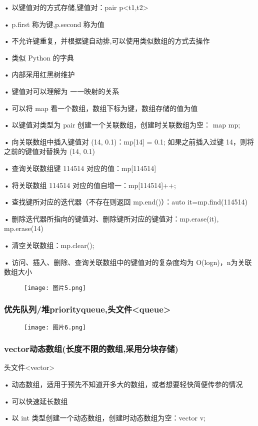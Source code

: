 \documentclass[UTF8]{ctexart}
\begin{document}
• 以键值对的方式存储,键值对：pair p<t1,t2> 

• p.first 称为键,p.second 称为值 

• 不允许键重复，并根据键自动排,可以使用类似数组的方式去操作 

• 类似 Python 的字典 

• 内部采用红黑树维护

• 键值对可以理解为 一一映射的关系 

• 可以将 map 看一个数组，数组下标为键，数组存储的值为值 

• 以键值对类型为 pair 创建一个关联数组，创建时关联数组为空： map mp;

• 向关联数组中插入键值对 (14, 0.1)：mp[14] = 0.1; 如果之前插入过键 14，则将之前的键值对替换为 (14, 0.1) 

• 查询关联数组键 114514 对应的值：mp[114514] 

• 将关联数组 114514 对应的值自增一：mp[114514]++;  

• 查找键所对应的迭代器（不存在则返回 mp.end()）：auto it=mp.find(114514) 

• 删除迭代器所指向的键值对、删除键所对应的键值对：mp.erase(it), mp.erase(14) 

• 清空关联数组：mp.clear(); 

• 访问、插入、删除、查询关联数组中的键值对的复杂度均为 O(logn)，n为关联数组大小

\begin{figure}[H]
    \centering
    \texttt{[image: 图片5.png]}
    \label{fig:enter-label}
\end{figure}

\subsubsection{优先队列/堆priority\textunderscore queue,头文件<queue>}
\begin{figure}[H]
    \centering
    \texttt{[image: 图片6.png]}
    \label{fig:enter-label}
\end{figure}

\subsubsection{vector动态数组(长度不限的数组,采用分块存储)}
头文件<vector>

• 动态数组，适用于预先不知道开多大的数组，或者想要轻快简便传参的情况 

• 可以快速延长数组

• 以 int 类型创建一个动态数组，创建时动态数组为空：vector v; 
\end{document}

